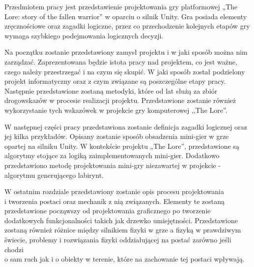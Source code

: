 \documentclass[oneside,polski,logo]{amuthesis}
\author{Kamil Tyrek, Mateusz Hypś, Jakub Kozubal}
\date{Poznań, luty 2021}
\begin{document}
\maketitle

\author{Kamil Tyrek}
\makestatement

\author{Mateusz Hypś}
\makestatement

\author{Jakub Kozubal}
\makestatement

\begin{streszczenie}
Przedmiotem pracy jest przedstawienie projektowania gry platformowej „The Lore: story of the fallen warrior” w oparciu o silnik Unity. Gra posiada elementy zręcznościowe oraz zagadki logiczne, przez co przechodzenie kolejnych etapów gry wymaga szybkiego podejmowania logicznych decyzji. \par
Na początku zostanie przedstawiony zamysł projektu i w jaki sposób można nim zarządzać. Zaprezentowana będzie istota pracy nad projektem, co jest ważne, czego należy przestrzegać i na czym się skupić. W jaki sposób został podzielony projekt informatyczny oraz z czym związane są poszczególne etapy pracy. Następnie przedstawione zostaną metodyki, które od lat służą za zbiór drogowskazów w procesie realizacji projektu. Przedstawione zostanie również wykorzystanie tych wskazówek w projekcie gry komputerowej ,,The Lore''. \par
W następnej części pracy przedstawiona zostanie definicja zagadki logicznej oraz jej kilka przykładów. Opisany zostanie sposób obsadzenia mini-gier w grze opartej na silniku Unity. W kontekście projektu „The Lore”, przedstawione są algorytmy stojące za logiką zaimplementowanych mini-gier. Dodatkowo przedstawiono metodę projektowania mini-gry niezawartej w projekcie - algorytmu generującego labirynt. \par
W ostatnim rozdziale przedstawiony zostanie opis procesu projektowania\\ i tworzenia postaci oraz mechanik z nią związanych. Elementy te zostaną przedstawione począwszy od projektowania graficznego po tworzenie dodatkowych funkcjonalności takich jak drzewko umiejętności. Przedstawione zostaną również różnice między silnikiem fizyki w grze a fizyką w prawdziwym świecie, problemy i rozwiązania fizyki oddziałującej na postać zarówno jeśli chodzi\\ o sam ruch jak i o obiekty w terenie, które na zachowanie tej postaci wpływają.
\end{streszczenie}
\tableofcontents
\end{document}
